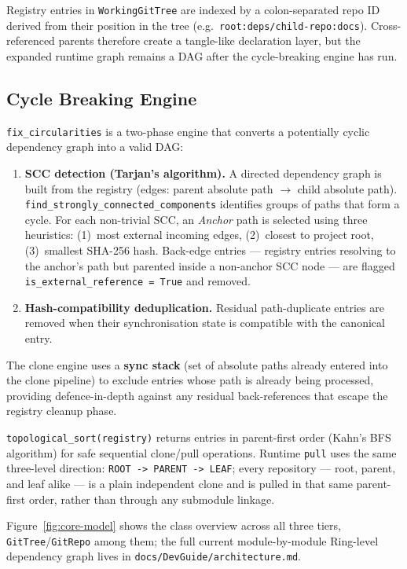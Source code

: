 Registry entries in \texttt{WorkingGitTree} are indexed by a
colon-separated repo ID derived from their position in the tree (e.g.\
\texttt{root:deps/child-repo:docs}).
Cross-referenced parents therefore create a tangle-like declaration layer, but
the expanded runtime graph remains a DAG after the cycle-breaking engine has
run.

\subsection*{Cycle Breaking Engine}

\texttt{fix\_circularities} is a two-phase engine that converts a potentially
cyclic dependency graph into a valid DAG:

\begin{enumerate}
  \item \textbf{SCC detection (Tarjan's algorithm).}  A directed dependency
    graph is built from the registry (edges: parent absolute path $\to$ child
    absolute path).  \texttt{find\_strongly\_connected\_components} identifies
    groups of paths that form a cycle.  For each non-trivial SCC, an
    \emph{Anchor} path is selected using three heuristics: (1)~most external
    incoming edges, (2)~closest to project root, (3)~smallest SHA-256 hash.
    Back-edge entries — registry entries resolving to the anchor's path but
    parented inside a non-anchor SCC node — are flagged
    \texttt{is\_external\_reference\,=\,True} and removed.
  \item \textbf{Hash-compatibility deduplication.}  Residual path-duplicate
    entries are removed when their synchronisation state is compatible with
    the canonical entry.
\end{enumerate}

The clone engine uses a \textbf{sync stack} (set of absolute paths already
entered into the clone pipeline) to exclude entries whose path is already
being processed, providing defence-in-depth against any residual back-references
that escape the registry cleanup phase.

\texttt{topological\_sort(registry)} returns entries in parent-first order
(Kahn's BFS algorithm) for safe sequential clone/pull operations.  Runtime
\texttt{pull} uses the same three-level direction: \texttt{ROOT -> PARENT ->
LEAF}; every repository --- root, parent, and leaf alike --- is a plain
independent clone and is pulled in that same parent-first order, rather than
through any submodule linkage.

Figure~\ref{fig:core-model} shows the class overview across all three
tiers, \texttt{GitTree}/\texttt{GitRepo} among them; the full current
module-by-module Ring-level dependency graph lives in
\texttt{docs/DevGuide/architecture.md}.

